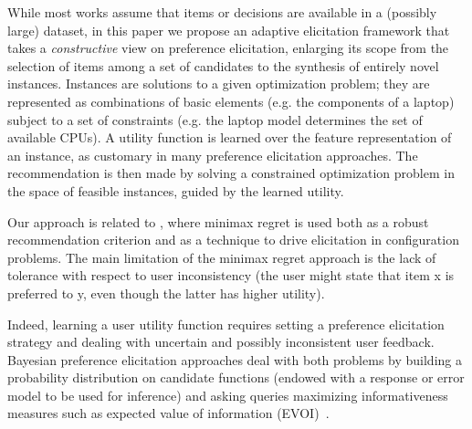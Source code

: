\documentclass{article}
\renewcommand\[{\begin{equation}}
\renewcommand\]{\end{equation}}
\begin{document}

While most works assume that items or decisions are available in a (possibly large)
dataset, in this paper we propose an adaptive elicitation framework that takes a {\em constructive} view on preference
elicitation, enlarging its scope from the selection of items among a
set of candidates to the synthesis of entirely novel instances. 
Instances are solutions to a given optimization problem; they are represented as combinations of basic elements
(e.g. the components of a laptop) subject to a set of constraints
(e.g. the laptop model determines the set of available CPUs). 
A utility function is learned over the feature representation of an
instance, as customary in many preference elicitation approaches. 
The recommendation is then made by solving a constrained optimization
 problem in the space of feasible instances, guided by the learned
utility. 

Our approach is related to \cite{boutilier2006}, where minimax regret is used both
as a robust recommendation criterion and as a technique to drive elicitation in configuration problems.
The main limitation of the minimax regret approach is the lack of tolerance with respect to user inconsistency (the user might state that item x is preferred to y, even though the latter has higher utility).

Indeed, learning a user utility function requires setting a preference
elicitation strategy and dealing with uncertain and possibly
inconsistent user feedback. 
Bayesian preference elicitation approaches
deal with both problems by building a probability distribution on
candidate functions (endowed with a response or error model to be used for inference) and asking queries maximizing informativeness
measures such as expected value of information (EVOI)~\cite{chajewska2000,viappiani2010optimal}. 
\end{document}
